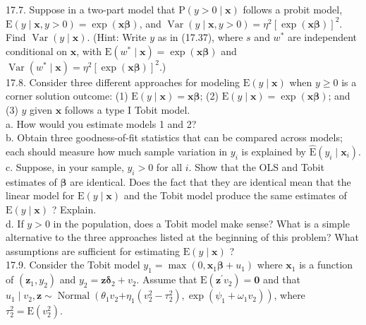 \documentclass[10pt]{article}
\begin{document}
17.7. Suppose in a two-part model that $\mathrm{P}(y>0 \mid \mathbf{x})$ follows a probit model, $\mathrm{E}(y \mid \mathbf{x}, y>0)=\exp (\mathbf{x} \boldsymbol{\beta})$, and $\operatorname{Var}(y \mid \mathbf{x}, y>0)=\eta^{2}[\exp (\mathbf{x} \boldsymbol{\beta})]^{2}$. Find $\operatorname{Var}(y \mid \mathbf{x})$. (Hint: Write $y$ as in (17.37), where $s$ and $w^{*}$ are independent conditional on $\mathbf{x}$, with $\mathrm{E}\left(w^{*} \mid \mathbf{x}\right)=\exp (\mathbf{x} \boldsymbol{\beta})$ and $\operatorname{Var}\left(w^{*} \mid \mathbf{x}\right)=\eta^{2}[\exp (\mathbf{x} \boldsymbol{\beta})]^{2}$.)\\
17.8. Consider three different approaches for modeling $\mathrm{E}(y \mid \mathbf{x})$ when $y \geq 0$ is a corner solution outcome: (1) $\mathrm{E}(y \mid \mathbf{x})=\mathbf{x} \boldsymbol{\beta}$; (2) $\mathrm{E}(y \mid \mathbf{x})=\exp (\mathbf{x} \boldsymbol{\beta})$; and (3) $y$ given $\mathbf{x}$ follows a type I Tobit model.\\
a. How would you estimate models 1 and 2?\\
b. Obtain three goodness-of-fit statistics that can be compared across models; each should measure how much sample variation in $y_{i}$ is explained by $\hat{\mathrm{E}}\left(y_{i} \mid \mathbf{x}_{i}\right)$.\\
c. Suppose, in your sample, $y_{i}>0$ for all $i$. Show that the OLS and Tobit estimates of $\boldsymbol{\beta}$ are identical. Does the fact that they are identical mean that the linear model for $\mathrm{E}(y \mid \mathbf{x})$ and the Tobit model produce the same estimates of $\mathrm{E}(y \mid \mathbf{x})$ ? Explain.\\
d. If $y>0$ in the population, does a Tobit model make sense? What is a simple alternative to the three approaches listed at the beginning of this problem? What assumptions are sufficient for estimating $\mathrm{E}(y \mid \mathbf{x})$ ?\\
17.9. Consider the Tobit model $y_{1}=\max \left(0, \mathbf{x}_{1} \boldsymbol{\beta}+u_{1}\right)$ where $\mathbf{x}_{1}$ is a function of $\left(\mathbf{z}_{1}, y_{2}\right)$ and $y_{2}=\mathbf{z} \boldsymbol{\delta}_{2}+v_{2}$. Assume that $\mathrm{E}\left(\mathbf{z}^{\prime} v_{2}\right)=\mathbf{0}$ and that $u_{1} \mid v_{2}, \mathbf{z} \sim \operatorname{Normal}\left(\theta_{1} v_{2}\right. \left.+\eta_{1}\left(v_{2}^{2}-\tau_{2}^{2}\right), \exp \left(\psi_{1}+\omega_{1} v_{2}\right)\right)$, where $\tau_{2}^{2}=\mathrm{E}\left(v_{2}^{2}\right)$.\\
\end{document}
